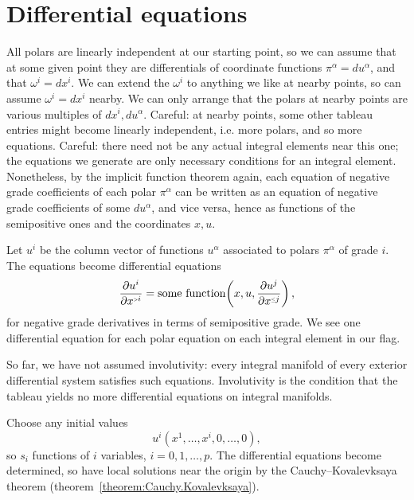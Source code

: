 \section{Differential equations}
All polars are linearly independent at our starting point, so we can assume that at some given point they are differentials of coordinate functions \(\pi^{\alpha}=du^{\alpha}\), and that \(\omega^i=dx^i\).
We can extend the \(\omega^i\) to anything we like at nearby points, so can assume \(\omega^i=dx^i\) nearby.
We can only arrange that the polars at nearby points are various multiples of \(dx^i,du^{\alpha}\).
Careful: at nearby points, some other tableau entries might become linearly independent, i.e. more polars, and so more equations.
Careful: there need not be any actual integral elements near this one; the equations we generate are only necessary conditions for an integral element.
Nonetheless, by the implicit function theorem again, each equation of negative grade coefficients of each polar \(\pi^{\alpha}\) can be written as an equation of negative grade coefficients of some \(du^{\alpha}\), and vice versa, hence as functions of the semipositive ones and the coordinates \(x,u\).

Let \(u^i\) be the column vector of functions \(u^{\alpha}\) associated to polars \(\pi^{\alpha}\) of grade \(i\).
The equations become differential equations
\[
\pderiv{u^i}{x^{\ggr{i}}}=\text{some function}\of{x,u,\pderiv{u^j}{x^{\legr{j}}}},\label{eqn:diff.eqs}
\]
for negative grade derivatives in terms of semipositive grade.
We see one differential equation for each polar equation on each integral element in our flag.

So far, we have not assumed involutivity: every integral manifold of every exterior differential system satisfies such equations.
Involutivity is the condition that the tableau yields no more differential equations on integral manifolds.

Choose\label{page:pdes} any initial values
\[
u^i(x^1,\dots,x^i,0,\dots,0),
\]
so \(s_i\) functions of \(i\) variables, \(i=0,1,\dots,p\).
The differential equations become determined, so have local solutions near the origin by the Cauchy--Kovalevksaya theorem (theorem~\vref{theorem:Cauchy.Kovalevksaya}).

